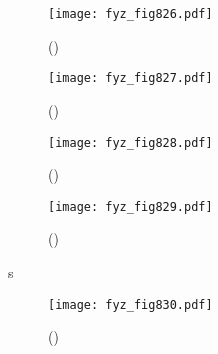     \begin{figure}[ht!] %
      \centering
      \texttt{[image: fyz\_fig826.pdf]}
      \caption{
               (\cite[s.~707]{Feynman02})}
      \label{fyz:fig826}
    \end{figure}

    \begin{figure}[ht!] %
      \centering
      \texttt{[image: fyz\_fig827.pdf]}
      \caption{
               (\cite[s.~707]{Feynman02})}
      \label{fyz:fig827}
    \end{figure}

    \begin{figure}[ht!] %
      \centering
      \texttt{[image: fyz\_fig828.pdf]}
      \caption{
               (\cite[s.~707]{Feynman02})}
      \label{fyz:fig828}
    \end{figure}

    \begin{figure}[ht!] %
      \centering
      \texttt{[image: fyz\_fig829.pdf]}
      \caption{
               (\cite[s.~707]{Feynman02})}
      \label{fyz:fig829}
    \end{figure}
s
    \begin{figure}[ht!] %
      \centering
      \texttt{[image: fyz\_fig830.pdf]}
      \caption{
               (\cite[s.~707]{Feynman02})}
      \label{fyz:fig830}
    \end{figure}


